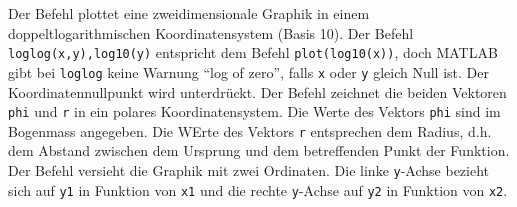 \newline\newline
Der Befehl  plottet eine zweidimensionale Graphik in einem doppeltlogarithmischen Koordinatensystem (Basis 10). Der Befehl {\color{red}\texttt{loglog(x,y),log10(y)}} entspricht dem Befehl {\color{red}\texttt{plot(log10(x))}}, doch MATLAB gibt bei \texttt{loglog} keine Warnung ``log of zero'', falls \texttt{x} oder \texttt{y} gleich Null ist. Der Koordinatennullpunkt wird unterdrückt.
\newline\newline
Der Befehl  zeichnet die beiden Vektoren \texttt{phi} und \texttt{r} in ein polares Koordinatensystem. Die Werte des Vektors \texttt{phi} sind im Bogenmass angegeben. Die WErte des Vektors \texttt{r} entsprechen dem Radius, d.h. dem Abstand zwischen dem Ursprung und dem betreffenden Punkt der Funktion.
\newline\newline
Der Befehl  versieht die Graphik mit zwei Ordinaten. Die linke \texttt{y}-Achse bezieht sich auf \texttt{y1} in Funktion von \texttt{x1} und die rechte \texttt{y}-Achse auf \texttt{y2} in Funktion von \texttt{x2}.
